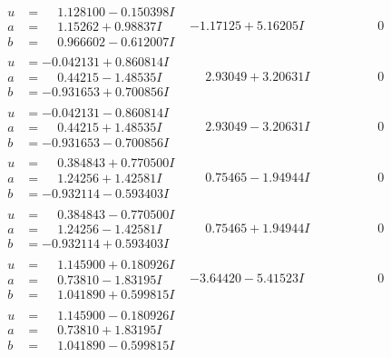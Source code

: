 \documentclass[1p]{elsarticle_modified}
\theoremstyle{definition}
\begin{document}
$$\begin{array}{c|c|c}
\begin{aligned}
u &= \phantom{-}1.128100 - 0.150398 I \\
a &= \phantom{-}1.15262 + 0.98837 I \\
b &= \phantom{-}0.966602 - 0.612007 I\end{aligned}
 & -1.17125 + 5.16205 I & \phantom{-0.000000 } 0 \\ \hline\begin{aligned}
u &= -0.042131 + 0.860814 I \\
a &= \phantom{-}0.44215 - 1.48535 I \\
b &= -0.931653 + 0.700856 I\end{aligned}
 & \phantom{-}2.93049 + 3.20631 I & \phantom{-0.000000 } 0 \\ \hline\begin{aligned}
u &= -0.042131 - 0.860814 I \\
a &= \phantom{-}0.44215 + 1.48535 I \\
b &= -0.931653 - 0.700856 I\end{aligned}
 & \phantom{-}2.93049 - 3.20631 I & \phantom{-0.000000 } 0 \\ \hline\begin{aligned}
u &= \phantom{-}0.384843 + 0.770500 I \\
a &= \phantom{-}1.24256 + 1.42581 I \\
b &= -0.932114 - 0.593403 I\end{aligned}
 & \phantom{-}0.75465 - 1.94944 I & \phantom{-0.000000 } 0 \\ \hline\begin{aligned}
u &= \phantom{-}0.384843 - 0.770500 I \\
a &= \phantom{-}1.24256 - 1.42581 I \\
b &= -0.932114 + 0.593403 I\end{aligned}
 & \phantom{-}0.75465 + 1.94944 I & \phantom{-0.000000 } 0 \\ \hline\begin{aligned}
u &= \phantom{-}1.145900 + 0.180926 I \\
a &= \phantom{-}0.73810 - 1.83195 I \\
b &= \phantom{-}1.041890 + 0.599815 I\end{aligned}
 & -3.64420 - 5.41523 I & \phantom{-0.000000 } 0 \\ \hline\begin{aligned}
u &= \phantom{-}1.145900 - 0.180926 I \\
a &= \phantom{-}0.73810 + 1.83195 I \\
b &= \phantom{-}1.041890 - 0.599815 I\end{aligned}

\end{array}$$
\end{document}
